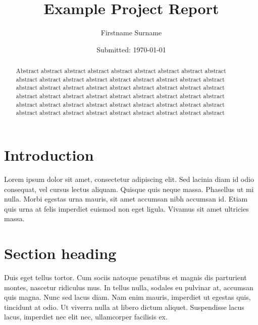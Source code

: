 \documentclass[12pt, onecolumn]{revtex4-2}    %
\begin{document}
                     


\title{Example Project Report} 
\date{Submitted: \today{}}
\author{Firstname Surname}

\begin{abstract}              
 
Abstract abstract abstract abstract abstract abstract abstract abstract abstract abstract abstract abstract abstract abstract abstract abstract abstract abstract abstract abstract abstract abstract abstract abstract abstract abstract abstract abstract abstract abstract abstract abstract abstract abstract abstract abstract abstract abstract abstract abstract abstract abstract abstract abstract abstract abstract abstract abstract abstract abstract abstract abstract abstract abstract 

\end{abstract}


\maketitle

\tableofcontents
\let\toc@pre\relax
\let\toc@post\relax

\newpage

\section {Introduction}
Lorem ipsum dolor sit amet, consectetur adipiscing elit. Sed lacinia diam id odio consequat, vel cursus lectus aliquam. Quisque quis neque massa. Phasellus ut mi nulla. Morbi egestas urna mauris, sit amet accumsan nibh accumsan id. Etiam quis urna at felis imperdiet euismod non eget ligula. Vivamus sit amet ultricies massa. 

\section{Section heading}
Duis eget tellus tortor. Cum sociis natoque penatibus et magnis dis parturient montes, nascetur ridiculus mus. In tellus nulla, sodales eu pulvinar at, accumsan quis magna. Nunc sed lacus diam. Nam enim mauris, imperdiet ut egestas quis, tincidunt at odio. Ut viverra nulla at libero dictum aliquet. Suspendisse lacus lacus, imperdiet nec elit nec, ullamcorper facilisis ex. 
\end{document}
